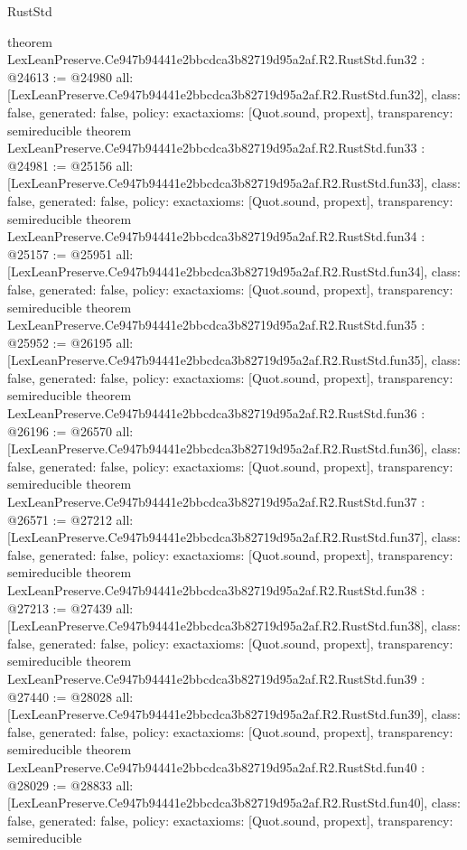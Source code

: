\begin{lexlean}{RustStd}
\begin{coremodule}
{}
theorem LexLeanPreserve.Ce947b94441e2bbcdca3b82719d95a2af.R2.RustStd.fun32 : @24613 := @24980 {
  all: [LexLeanPreserve.Ce947b94441e2bbcdca3b82719d95a2af.R2.RustStd.fun32],
  class: false,
  generated: false,
  policy: exact{axioms: [Quot.sound, propext]},
  transparency: semireducible
}
theorem LexLeanPreserve.Ce947b94441e2bbcdca3b82719d95a2af.R2.RustStd.fun33 : @24981 := @25156 {
  all: [LexLeanPreserve.Ce947b94441e2bbcdca3b82719d95a2af.R2.RustStd.fun33],
  class: false,
  generated: false,
  policy: exact{axioms: [Quot.sound, propext]},
  transparency: semireducible
}
theorem LexLeanPreserve.Ce947b94441e2bbcdca3b82719d95a2af.R2.RustStd.fun34 : @25157 := @25951 {
  all: [LexLeanPreserve.Ce947b94441e2bbcdca3b82719d95a2af.R2.RustStd.fun34],
  class: false,
  generated: false,
  policy: exact{axioms: [Quot.sound, propext]},
  transparency: semireducible
}
theorem LexLeanPreserve.Ce947b94441e2bbcdca3b82719d95a2af.R2.RustStd.fun35 : @25952 := @26195 {
  all: [LexLeanPreserve.Ce947b94441e2bbcdca3b82719d95a2af.R2.RustStd.fun35],
  class: false,
  generated: false,
  policy: exact{axioms: [Quot.sound, propext]},
  transparency: semireducible
}
theorem LexLeanPreserve.Ce947b94441e2bbcdca3b82719d95a2af.R2.RustStd.fun36 : @26196 := @26570 {
  all: [LexLeanPreserve.Ce947b94441e2bbcdca3b82719d95a2af.R2.RustStd.fun36],
  class: false,
  generated: false,
  policy: exact{axioms: [Quot.sound, propext]},
  transparency: semireducible
}
theorem LexLeanPreserve.Ce947b94441e2bbcdca3b82719d95a2af.R2.RustStd.fun37 : @26571 := @27212 {
  all: [LexLeanPreserve.Ce947b94441e2bbcdca3b82719d95a2af.R2.RustStd.fun37],
  class: false,
  generated: false,
  policy: exact{axioms: [Quot.sound, propext]},
  transparency: semireducible
}
theorem LexLeanPreserve.Ce947b94441e2bbcdca3b82719d95a2af.R2.RustStd.fun38 : @27213 := @27439 {
  all: [LexLeanPreserve.Ce947b94441e2bbcdca3b82719d95a2af.R2.RustStd.fun38],
  class: false,
  generated: false,
  policy: exact{axioms: [Quot.sound, propext]},
  transparency: semireducible
}
theorem LexLeanPreserve.Ce947b94441e2bbcdca3b82719d95a2af.R2.RustStd.fun39 : @27440 := @28028 {
  all: [LexLeanPreserve.Ce947b94441e2bbcdca3b82719d95a2af.R2.RustStd.fun39],
  class: false,
  generated: false,
  policy: exact{axioms: [Quot.sound, propext]},
  transparency: semireducible
}
theorem LexLeanPreserve.Ce947b94441e2bbcdca3b82719d95a2af.R2.RustStd.fun40 : @28029 := @28833 {
  all: [LexLeanPreserve.Ce947b94441e2bbcdca3b82719d95a2af.R2.RustStd.fun40],
  class: false,
  generated: false,
  policy: exact{axioms: [Quot.sound, propext]},
  transparency: semireducible
}
\end{coremodule}
\end{lexlean}
